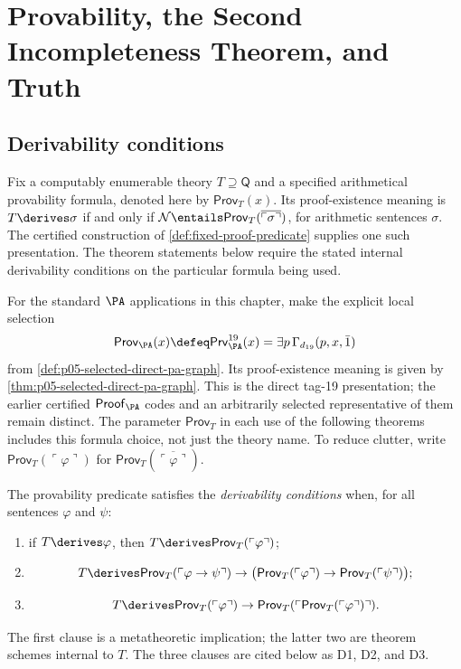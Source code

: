 \chapter{Provability, the Second Incompleteness Theorem, and Truth}
\label{ch:second-incompleteness}

\section{Derivability conditions}
\label{sec:second-incompleteness-01}

Fix a computably enumerable theory \(T\supseteq\mathsf Q\) and a
specified arithmetical provability formula, denoted here by
\(\mathsf{Prov}_T(x)\). Its proof-existence meaning is
\(T\derives\sigma\) if and only if
\(\mathcal N\entails\mathsf{Prov}_T
(\overline{\ulcorner\sigma\urcorner})\), for arithmetic sentences
\(\sigma\). The certified construction of
\cref{def:fixed-proof-predicate} supplies one such presentation.
The theorem statements below require the stated internal derivability
conditions on the particular formula being used.

For the standard \(\PA\) applications in this chapter, make the explicit
local selection
\[
 \mathsf{Prov}_{\PA}(x)\defeq\mathsf{Prv}^{19}_{\PA}(x)
     =\exists p\,\Gamma_{d_{19}}(p,x,\bar1)
\]
from \cref{def:p05-selected-direct-pa-graph}.
Its proof-existence meaning is given by
\cref{thm:p05-selected-direct-pa-graph}. This is the direct tag-19
presentation; the earlier certified \(\mathsf{Proof}_{\PA}\) codes
and an arbitrarily selected representative of them remain distinct.
The parameter \(\mathsf{Prov}_T\) in each use of the following theorems
includes this formula choice, not just the theory name.
To reduce clutter, write
\(\mathsf{Prov}_T(\ulcorner\varphi\urcorner)\) for
\(\mathsf{Prov}_T(\overline{\ulcorner\varphi\urcorner})\).

\begin{definition}
The provability predicate satisfies the \emph{derivability conditions} when,
for all sentences \(\varphi\) and \(\psi\):
\begin{enumerate}
  \item if \(T\derives\varphi\), then
        \(T\derives\mathsf{Prov}_T(\ulcorner\varphi\urcorner)\);
  \item
  \[
    T\derives
    \mathsf{Prov}_T(\ulcorner\varphi\to\psi\urcorner)
    \to
    \bigl(\mathsf{Prov}_T(\ulcorner\varphi\urcorner)
    \to\mathsf{Prov}_T(\ulcorner\psi\urcorner)\bigr);
  \]
  \item
  \[
    T\derives
    \mathsf{Prov}_T(\ulcorner\varphi\urcorner)
    \to
    \mathsf{Prov}_T
    (\ulcorner\mathsf{Prov}_T(\ulcorner\varphi\urcorner)\urcorner).
  \]
\end{enumerate}
The first clause is a metatheoretic implication; the latter two are theorem
schemes internal to \(T\).  The three clauses are cited below as D1, D2,
and D3.
\end{definition}

